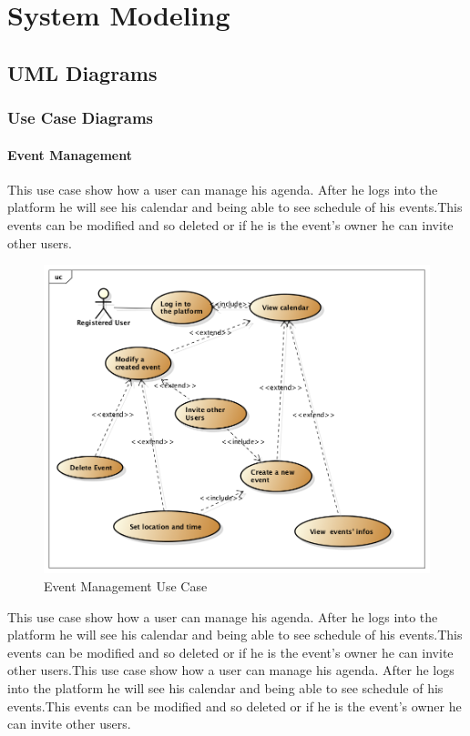 \chapter{System Modeling} \label{cap:cap4}
\section{UML Diagrams}
\subsection{Use Case Diagrams}
\subsubsection{Event Management}
This use case show how a user can manage his agenda. After he logs into the platform he will see his calendar and being able to see schedule of his events.This events can be modified and so deleted or if he is the event's owner he can invite other users.
 \begin{center}
 \begin{figure}[H]
    \includegraphics[width=1\textwidth]{../UMLDiagram/use_case/EventManagmentUseCase/EventManagment.png}
    \caption{Event Management Use Case}
     \label{fig:eventusecase}
     \end{figure}
   \end{center}  
This use case show how a user can manage his agenda. After he logs into the platform he will see his calendar and being able to see schedule of his events.This events can be modified and so deleted or if he is the event's owner he can invite other users.This use case show how a user can manage his agenda. After he logs into the platform he will see his calendar and being able to see schedule of his events.This events can be modified and so deleted or if he is the event's owner he can invite other users.
